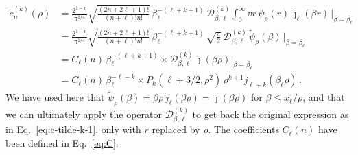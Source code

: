   \begin{equation}
  \begin{split}
   \tilde{c}_n^{(k)}(\rho) &=
   \frac{2^{1-n}}{\pi^{1/4}} \sqrt{\frac{(2n+2\ell+1)!}{(n+\ell)!n!}}
   \,\beta_\ell^{-(\ell+k+1)} \,
   \mathcal{D}_{\beta,\ell}^{(k)} \int_0^\infty\dd r\,\psi_\rho(r)\,
   \hat\jmath_{\ell}(\beta r)\,\Big|_{\beta=\beta_\ell} \\[0.8em]
   &= \frac{2^{1-n}}{\pi^{1/4}} \sqrt{\frac{(2n+2\ell+1)!}{(n+\ell)!n!}}
   \,\beta_\ell^{-(\ell+k+1)} \,
   \sqrt{\frac\pi2}\,
   \mathcal{D}_{\beta,\ell}^{(k)}\,\tilde{\psi}_\rho(\beta)\,
   \Big|_{\beta=\beta_\ell} \\[0.8em]
   &= C_\ell(n)\,\beta_\ell^{-(\ell+k+1)}
   \times \mathcal{D}_{\beta,\ell}^{(k)}\,\hat\jmath(\beta\rho)
   \Big|_{\beta=\beta_\ell} \\[0.8em]
   &= C_\ell(n)\,\beta_\ell^{-\ell-k} \times P_k(\ell+3/2,\rho^2)\,
   \rho^{k+1} j_{\ell+k}(\beta_\ell\rho) \,.
  \end{split}
  \label{eq:c-tilde-k-2}
  \end{equation}
  We have used here that $\tilde{\psi}_\rho(\beta) = \beta\rho\,
  j_\ell(\beta\rho) = \hat\jmath(\beta\rho)$ for $\beta \leq x_\ell/\rho$,
  and that we can ultimately apply the operator
  $\mathcal{D}_{\beta,\ell}^{(k)}$ to get back the original expression as
  in Eq.~\eqref{eq:c-tilde-k-1}, only with $r$ replaced by
  $\rho$.  The coefficients $C_\ell(n)$ have been defined in Eq.~\eqref{eq:C}.

